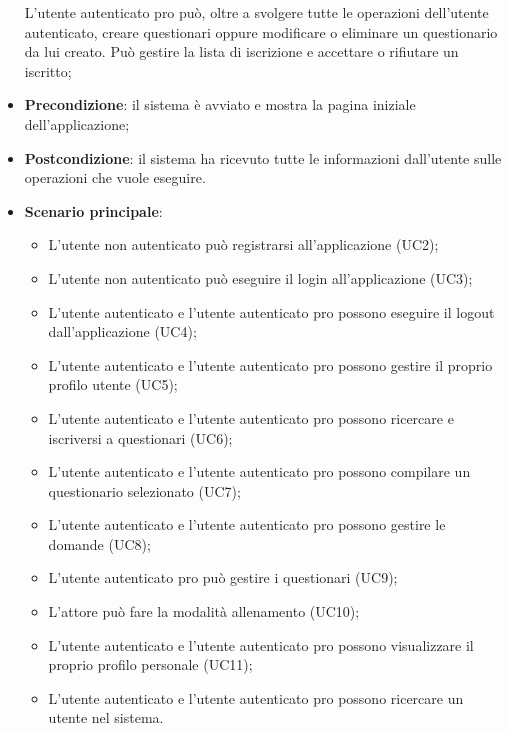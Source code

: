 \begin{itemize}
L'utente autenticato pro può, oltre a svolgere tutte le operazioni dell'utente autenticato, creare questionari oppure modificare o eliminare un questionario da lui creato. Può gestire la lista di iscrizione e accettare o rifiutare un iscritto;
\item\textbf{Precondizione}: il sistema è avviato e mostra la pagina iniziale dell'applicazione;
\item\textbf{Postcondizione}: il sistema ha ricevuto tutte le informazioni dall'utente sulle operazioni che vuole eseguire.
\item\textbf{Scenario principale}:
\begin{itemize}
\item L'utente non autenticato può registrarsi all'applicazione (UC2);
\item L'utente non autenticato può eseguire il login all'applicazione (UC3);
\item L'utente autenticato e l'utente autenticato pro possono eseguire il logout dall'applicazione (UC4); 
\item L'utente autenticato e l'utente autenticato pro possono gestire il proprio profilo utente (UC5);
\item L'utente autenticato e l'utente autenticato pro possono ricercare e iscriversi a questionari (UC6);
\item L'utente autenticato e l'utente autenticato pro possono compilare un questionario selezionato (UC7);
\item L'utente autenticato e l'utente autenticato pro possono gestire le domande (UC8);
\item L'utente autenticato pro può gestire i questionari (UC9);
\item L'attore può fare la modalità allenamento (UC10);
\item L'utente autenticato e l'utente autenticato pro possono visualizzare il proprio profilo personale (UC11);
\item L'utente autenticato e l'utente autenticato pro possono ricercare un utente nel sistema.
\end{itemize}
\end{itemize}